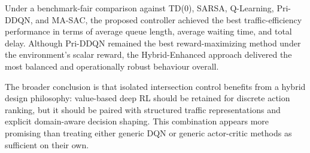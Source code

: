 \documentclass[conference]{IEEEtran}
\begin{document}
Under a benchmark-fair comparison against TD(0), SARSA, Q-Learning,
Pri-DDQN, and MA-SAC, the proposed controller achieved the best
traffic-efficiency performance in terms of average queue length,
average waiting time, and total delay. Although Pri-DDQN remained the
best reward-maximizing method under the environment's scalar reward,
the Hybrid-Enhanced approach delivered the most balanced and
operationally robust behaviour overall.

The broader conclusion is that isolated intersection control benefits
from a hybrid design philosophy: value-based deep RL should be
retained for discrete action ranking, but it should be paired with
structured traffic representations and explicit domain-aware
decision shaping. This combination appears more promising than
treating either generic DQN or generic actor-critic methods as
sufficient on their own.

\balance


\end{document}
